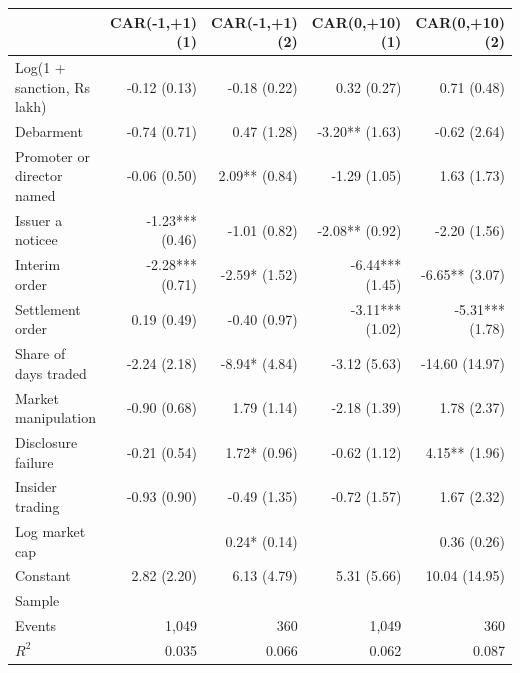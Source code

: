 \begin{tabular*}{\textwidth}[]{l@{\extracolsep\fill}rrrr}
\toprule
 & CAR(-1,+1) (1) & CAR(-1,+1) (2) & CAR(0,+10) (1) & CAR(0,+10) (2)\\
\midrule
Log(1 + sanction, Rs lakh) & -0.12 (0.13) & -0.18 (0.22) & 0.32 (0.27) & 0.71 (0.48)\\
Debarment & -0.74 (0.71) & 0.47 (1.28) & -3.20** (1.63) & -0.62 (2.64)\\
Promoter or director named & -0.06 (0.50) & 2.09** (0.84) & -1.29 (1.05) & 1.63 (1.73)\\
Issuer a noticee & -1.23*** (0.46) & -1.01 (0.82) & -2.08** (0.92) & -2.20 (1.56)\\
Interim order & -2.28*** (0.71) & -2.59* (1.52) & -6.44*** (1.45) & -6.65** (3.07)\\
Settlement order & 0.19 (0.49) & -0.40 (0.97) & -3.11*** (1.02) & -5.31*** (1.78)\\
Share of days traded & -2.24 (2.18) & -8.94* (4.84) & -3.12 (5.63) & -14.60 (14.97)\\
Market manipulation & -0.90 (0.68) & 1.79 (1.14) & -2.18 (1.39) & 1.78 (2.37)\\
Disclosure failure & -0.21 (0.54) & 1.72* (0.96) & -0.62 (1.12) & 4.15** (1.96)\\
Insider trading & -0.93 (0.90) & -0.49 (1.35) & -0.72 (1.57) & 1.67 (2.32)\\
Log market cap &  & 0.24* (0.14) &  & 0.36 (0.26)\\
Constant & 2.82 (2.20) & 6.13 (4.79) & 5.31 (5.66) & 10.04 (14.95)\\
\midrule
\multicolumn{5}{l}{Sample}\\
Events & 1,049 & 360 & 1,049 & 360\\
$R^2$ & 0.035 & 0.066 & 0.062 & 0.087\\
\bottomrule
\end{tabular*}
